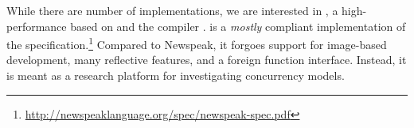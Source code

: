
While there are number of \Newspeak{} implementations, we are interested in \SOMns{} , a high-performance \vm{} based on \Truffle{} and the \Graal{} compiler .
\SOMns{} is a \emph{mostly} compliant implementation of the \Newspeak{} specification.\footnote{\url{http://newspeaklanguage.org/spec/newspeak-spec.pdf}} Compared to Newspeak, it forgoes support for image-based development, many
reflective features, and a foreign function interface. Instead, it is meant as
a research platform for investigating concurrency models.
 